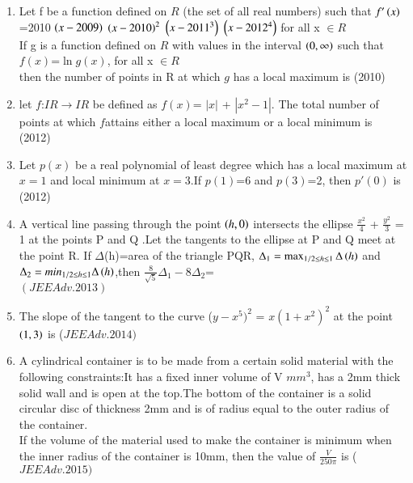 \documentclass[journal,12pt,twocolumn]{IEEEtran}
\theoremstyle{remark}
\begin{document}
																				 \begin{enumerate}
																				 \item Let f be a function defined on $R$ (the set of all real numbers) such that $f'\left(x\right)$=2010 $\left(x-2009\right)$ $\left(x-2010\right)^2$ $\left(x-2011^3\right)$ $\left(x-2012^4\right)$ for all x $\in R$ \\ If g is a function defined on $R$ with values in the interval $\left(0,\infty\right)$ such that \\
																				   $f(x)$=$\ln{g(x)}$, for all x $\in R$\\ then the number of points in R at which $g$ has a local maximum is \hfill (2010)\\
																				   \item let $f$:$IR \rightarrow IR$ be defined as $f(x)$= $|x|$ + $|x^2-1|$. The total number of points at which $f$attains either a local maximum or a local minimum is\\ \hfill (2012) \\
																				   \item Let $p(x)$ be a real polynomial of least degree which has a local maximum at $x=1$ and local minimum at $x=3$.If $p(1)$=6 and $p(3)$=2, then $p'(0)$ is \hfill (2012) \\
																				   \item A vertical line passing through the point $\left(h,0\right)$ intersects the ellipse $\frac{x^2}{4}$ + $\frac{y^2}{3}$ = 1 at the points P and Q .Let the tangents to the ellipse at P and Q meet at the point R. If $\Delta$(h)=area of the triangle PQR, $\Delta_1  = \max _{1/2\leq h \leq 1}\Delta\left(h\right)$ and $\Delta_2 = min_{1/2\leq h \leq 1}\Delta\left(h\right)$,then $\frac{8}{\sqrt{5}}\Delta_1 - 8\Delta_2$=\\\hfill $(JEEAdv.2013)$\\
																				   \item The slope of the tangent to the curve ($y-x^5)^2$ = $x(1+x^2)^2$ at the point $\left(1,3\right)$ is \hfill ($JEE Adv. 2014)$ \\
																				   \item A cylindrical container is to be made from a certain solid material with the following constraints:It has a fixed inner volume of V $mm^3$, has a 2mm thick solid wall and is open at the top.The bottom of the container is a solid circular disc of thickness 2mm and is of radius equal to the outer radius of the container.\\If the volume of the material used to make the container is minimum when the inner radius of the container is 10mm, then the value of $\frac{V}{250\pi}$ is \hfill ($JEE Adv. 2015)$ \\  
																				   \end{enumerate}
																				   
\end{document}
